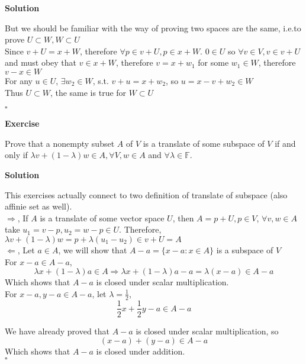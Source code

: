\documentclass{article}
\newenvironment{exercise}{%
{\textbf{Exercise\\}
    }
}{
}
\newenvironment{solution}{%
{
    \textbf{Solution\\}
    }
}{
  \hfill $\square$ 
  \par\bigskip 
}
\newcommand{\FF}{\mathbb{F}}
\begin{document}
\begin{CJK}{UTF8}{gkai}
\begin{solution}
    But we should be familiar with the way of proving two spaces are the same, i.e.to prove $U \subset W, W \subset U$\\

    Since $v + U = x + W$, therefore $\forall p \in v + U, p \in x+ W$. $0 \in U$ so $\forall v \in V, v \in v + U$ and must obey that $v \in x + W$, therefore $v = x + w_1$ for some $w_1 \in W$, therefore $v - x \in W$\\

    For any $u \in U$, $\exists w_2 \in W$, s.t. $v + u = x + w_2$, so $u = x - v + w_2 \in W$\\

    Thus $U \subset W$, the same is true for $W \subset U$
\end{solution}

\begin{exercise}
    Prove that a nonempty subset $A$ of $V$ is a translate of some subspace of $V$ if and only if $\lambda v + (1 - \lambda )w \in A ,\forall V,w \in A$ and $\forall \lambda  \in \FF$.
\end{exercise}

\begin{solution}
    This exercises actually connect to two definition of translate of subspace (also affinie set as well).\\

    $\Rightarrow$, If $A$ is a translate of some vector space $U$, then $A = p + U, p \in V$, $\forall v,w \in A $ take $u_1 = v - p, u_2 = w -p \in U$. Therefore, $\lambda v + (1 - \lambda) w = p + \lambda(u_1 - u_2) \in v + U = A$\\

    $\Leftarrow$, Let $a \in A$, we will show that $A - a = \{x - a: x \in A\}$ is a subspace of $V$\\

    For $x - a \in A - a$, 
    \[\lambda x + (1 - \lambda) a \in A \Rightarrow \lambda x + (1 - \lambda) a - a = \lambda(x - a) \in A - a\]
    Which shows that $A - a$ is closed under scalar multiplication.\\

    For $x - a, y - a \in A - a$, let $\lambda = \frac{1}{2}$,
    \[\dfrac{1}{2}x + \dfrac{1}{2}y - a\in A - a \]

    We have already proved that $A - a$ is closed under scalar multiplication, so
    \[(x - a) + (y - a) \in A - a\]
    Which shows that $A - a$ is closed under addition.\\
    

\end{solution}
\end{CJK}
\end{document}
